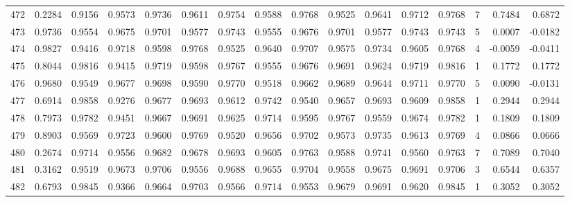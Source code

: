 \begin{tabular}{lrrrrrrrrrrrrrrr}
472 &      0.2284 &  0.9156 &  0.9573 &  0.9736 &  0.9611 &  0.9754 &  0.9588 &  0.9768 &  0.9525 &  0.9641 &   0.9712 &     0.9768 &      7 &                    0.7484 &                     0.6872 \\
473 &      0.9736 &  0.9554 &  0.9675 &  0.9701 &  0.9577 &  0.9743 &  0.9555 &  0.9676 &  0.9701 &  0.9577 &   0.9743 &     0.9743 &      5 &                    0.0007 &                    -0.0182 \\
474 &      0.9827 &  0.9416 &  0.9718 &  0.9598 &  0.9768 &  0.9525 &  0.9640 &  0.9707 &  0.9575 &  0.9734 &   0.9605 &     0.9768 &      4 &                   -0.0059 &                    -0.0411 \\
475 &      0.8044 &  0.9816 &  0.9415 &  0.9719 &  0.9598 &  0.9767 &  0.9555 &  0.9676 &  0.9691 &  0.9624 &   0.9719 &     0.9816 &      1 &                    0.1772 &                     0.1772 \\
476 &      0.9680 &  0.9549 &  0.9677 &  0.9698 &  0.9590 &  0.9770 &  0.9518 &  0.9662 &  0.9689 &  0.9644 &   0.9711 &     0.9770 &      5 &                    0.0090 &                    -0.0131 \\
477 &      0.6914 &  0.9858 &  0.9276 &  0.9677 &  0.9693 &  0.9612 &  0.9742 &  0.9540 &  0.9657 &  0.9693 &   0.9609 &     0.9858 &      1 &                    0.2944 &                     0.2944 \\
478 &      0.7973 &  0.9782 &  0.9451 &  0.9667 &  0.9691 &  0.9625 &  0.9714 &  0.9595 &  0.9767 &  0.9559 &   0.9674 &     0.9782 &      1 &                    0.1809 &                     0.1809 \\
479 &      0.8903 &  0.9569 &  0.9723 &  0.9600 &  0.9769 &  0.9520 &  0.9656 &  0.9702 &  0.9573 &  0.9735 &   0.9613 &     0.9769 &      4 &                    0.0866 &                     0.0666 \\
480 &      0.2674 &  0.9714 &  0.9556 &  0.9682 &  0.9678 &  0.9693 &  0.9605 &  0.9763 &  0.9588 &  0.9741 &   0.9560 &     0.9763 &      7 &                    0.7089 &                     0.7040 \\
481 &      0.3162 &  0.9519 &  0.9673 &  0.9706 &  0.9556 &  0.9688 &  0.9655 &  0.9704 &  0.9558 &  0.9675 &   0.9691 &     0.9706 &      3 &                    0.6544 &                     0.6357 \\
482 &      0.6793 &  0.9845 &  0.9366 &  0.9664 &  0.9703 &  0.9566 &  0.9714 &  0.9553 &  0.9679 &  0.9691 &   0.9620 &     0.9845 &      1 &                    0.3052 &                     0.3052 \\

\end{tabular}
